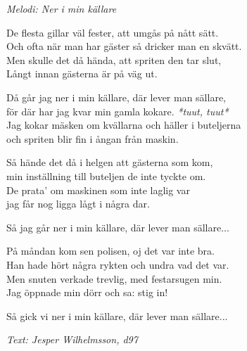 {\footnotesize\textit{Melodi: Ner i min källare}}\par
\vspace{10pt}
De flesta gillar väl fester, att umgås på nått sätt.\\
Och ofta när man har gäster så dricker man en skvätt.\\
Men skulle det då hända, att spriten den tar slut,\\
Långt innan gästerna är på väg ut.\par
\vspace{10pt}
Då går jag ner i min källare, där lever man sällare,\\
för där har jag kvar min gamla kokare. \textit{*tuut, tuut*}\\
Jag kokar mäsken om kvällarna och häller i buteljerna \\
och spriten blir fin i ångan från maskin.\par
\vspace{10pt}
Så hände det då i helgen att gästerna som kom, \\
min inställning till buteljen de inte tyckte om.\\
De prata' om maskinen som inte laglig var\\
jag får nog ligga lågt i några dar.\par
\vspace{10pt}
Så jag går ner i min källare, där lever man sällare...\par
\vspace{10pt}
På måndan kom sen polisen, oj det var inte bra.\\
Han hade hört några rykten och undra vad det var.\\
Men snuten verkade trevlig, med festarsugen min.\\
Jag öppnade min dörr och sa: stig in!\par
\vspace{10pt}
Så gick vi ner i min källare, där lever man sällare...\par
\vspace{10pt}
{\footnotesize\textit{Text: Jesper Wilhelmsson, d97}}

